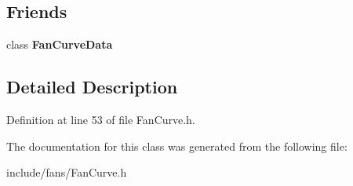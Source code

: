 \subsection*{Friends}
\begin{DoxyCompactItemize}
\item 
\mbox{\label{class_fan_curve_data_1_1_rated_point_a84779ae1f4b93a96435593980fe1445b}} 
class {\bfseries Fan\+Curve\+Data}
\end{DoxyCompactItemize}


\subsection{Detailed Description}


Definition at line 53 of file Fan\+Curve.\+h.



The documentation for this class was generated from the following file\+:\begin{DoxyCompactItemize}
\item 
include/fans/Fan\+Curve.\+h\end{DoxyCompactItemize}
